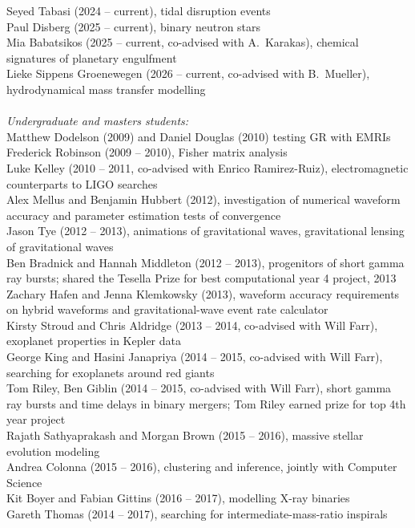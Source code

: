 \documentclass[margin,line]{res}
\begin{document}
\begin{resume}
Seyed Tabasi (2024 -- current), tidal disruption events\\
Paul Disberg (2025 -- current), binary neutron stars\\
Mia Babatsikos (2025 -- current, co-advised with A.~Karakas), chemical signatures of planetary engulfment\\
Lieke Sippens Groenewegen (2026 -- current, co-advised with B.~Mueller), hydrodynamical mass transfer modelling\\
\\
{\it Undergraduate and masters students:}\\
Matthew Dodelson (2009) and Daniel Douglas (2010) testing GR with EMRIs\\ 
Frederick Robinson (2009 -- 2010), Fisher matrix analysis\\
Luke Kelley (2010 -- 2011, co-advised with Enrico Ramirez-Ruiz), electromagnetic counterparts to LIGO searches\\
Alex Mellus and Benjamin Hubbert (2012), investigation of numerical waveform accuracy and parameter estimation tests of convergence\\
Jason Tye (2012 -- 2013), animations of gravitational waves, gravitational lensing of gravitational waves\\
Ben Bradnick and Hannah Middleton (2012 -- 2013), progenitors of short gamma ray bursts; shared the Tesella Prize for best computational year 4 project, 2013\\
Zachary Hafen and Jenna Klemkowsky (2013), waveform accuracy requirements on hybrid waveforms and gravitational-wave event rate calculator\\
Kirsty Stroud and Chris Aldridge (2013 -- 2014, co-advised with Will Farr),  exoplanet properties in Kepler data\\
George King and Hasini Janapriya (2014 -- 2015, co-advised with Will Farr), searching for exoplanets around red giants\\
Tom Riley, Ben Giblin (2014 -- 2015, co-advised with Will Farr), short gamma ray bursts and time delays in binary mergers; Tom Riley earned prize for top 4th year project\\
Rajath Sathyaprakash and Morgan Brown (2015 -- 2016), massive stellar evolution modeling\\
Andrea Colonna (2015 -- 2016), clustering and inference, jointly with Computer Science\\
Kit Boyer and Fabian Gittins (2016 -- 2017), modelling X-ray binaries\\
Gareth Thomas (2014 -- 2017), searching for intermediate-mass-ratio inspirals\\

\end{resume}
\end{document}

